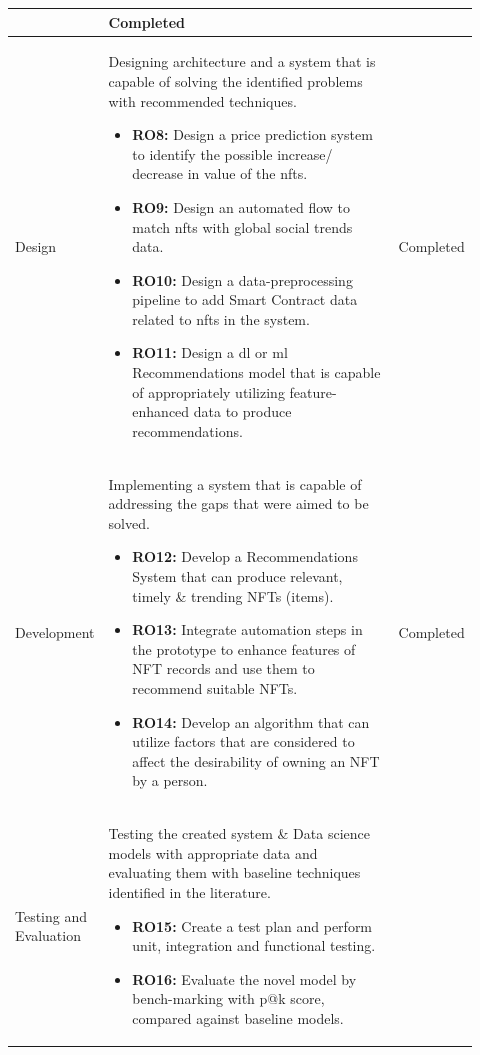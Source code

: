 \begin{longtable}{| p{0.135\linewidth} | p{0.63\linewidth}| p{0.15\linewidth}|}
\begin{itemize}
\end{itemize}
&
Completed\\
\hline
Design & Designing architecture and a system that is capable of solving the identified problems with recommended techniques.
\begin{itemize}
\item \textbf{RO8:} Design a price prediction system to identify the possible increase/ decrease in value of the \Gls{nft}s.
\item \textbf{RO9:} Design an automated flow to match \Gls{nft}s with global social trends data.
\item \textbf{RO10:} Design a data-preprocessing pipeline to add Smart Contract data related to \Gls{nft}s in the system.
\item \textbf{RO11:} Design a \Gls{dl} or \Gls{ml} Recommendations model that is capable of appropriately utilizing feature-enhanced data to produce recommendations.
\vspace{-7mm}       %
\end{itemize}
&
Completed\\
\hline
Development & Implementing a system that is capable of addressing the gaps that were aimed to be solved. 
\begin{itemize}
\item \textbf{RO12:} Develop a Recommendations System that can produce relevant, timely \& trending NFTs (items).
\item \textbf{RO13:} Integrate automation steps in the prototype to enhance features of NFT records and use them to recommend suitable NFTs.
\item \textbf{RO14:} Develop an algorithm that can utilize factors that are considered to affect the desirability of owning an NFT by a person.
\vspace{-7mm}       %
\end{itemize}
&
Completed\\
\hline
Testing and Evaluation & Testing the created system \& Data science models with appropriate data and evaluating them with baseline techniques identified in the literature. 
\begin{itemize}
\item \textbf{RO15:} Create a test plan and perform unit, integration and functional testing.
\item \textbf{RO16:} Evaluate the novel model by bench-marking with  \Gls{p@k} score, compared against baseline models.
\vspace{-7mm}       %

\end{itemize}
\end{longtable}
